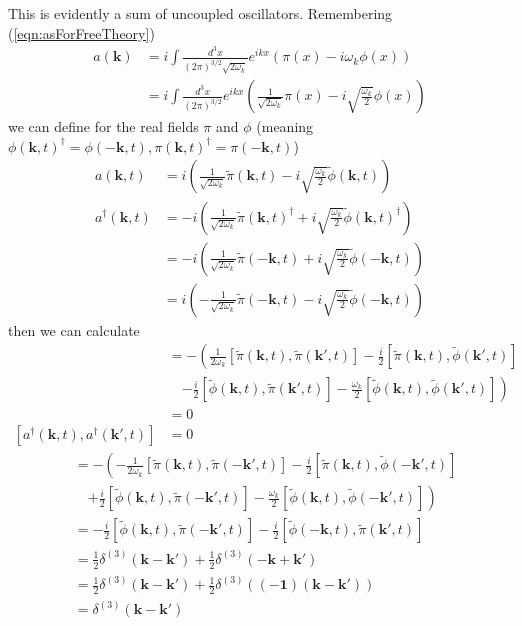 \documentclass{article}
\begin{document}
This is evidently a sum of uncoupled oscillators. Remembering  (\ref{eqn:asForFreeTheory})
\begin{align}
a(\mathbf{k})
&=i\int\frac{d^3x}{(2\pi)^{3/2}\sqrt{2\omega_k}}e^{ikx}(\pi(x)-i\omega_k\phi(x))\\
&=i\int\frac{d^3x}{(2\pi)^{3/2}}e^{ikx}\left(\frac{1}{\sqrt{2\omega_k}}\pi(x)-i\sqrt{\frac{\omega_k}{2}}\phi(x)\right) 
\end{align}
we can define for the real fields $\pi$ and $\phi$ (meaning $\phi(\mathbf{k},t)^\dagger=\phi(-\mathbf{k},t), \pi(\mathbf{k},t)^\dagger=\pi(-\mathbf{k},t)$)
\begin{align}
\label{eqn:akt}
a(\mathbf{k},t)
&=i\left(\frac{1}{\sqrt{2\omega_k}}\tilde\pi(\mathbf{k},t)-i\sqrt{\frac{\omega_k}{2}}\tilde\phi(\mathbf{k},t)\right)\\
a^\dagger(\mathbf{k},t)
&=-i\left(\frac{1}{\sqrt{2\omega_k}}\tilde\pi(\mathbf{k},t)^\dagger+i\sqrt{\frac{\omega_k}{2}}\tilde\phi(\mathbf{k},t)^\dagger\right)\\
&=-i\left(\frac{1}{\sqrt{2\omega_k}}\tilde\pi(-\mathbf{k},t)+i\sqrt{\frac{\omega_k}{2}}\tilde\phi(-\mathbf{k},t)\right)\\
&=i\left(-\frac{1}{\sqrt{2\omega_k}}\tilde\pi(-\mathbf{k},t)-i\sqrt{\frac{\omega_k}{2}}\tilde\phi(-\mathbf{k},t)\right) 
\end{align}
then we can calculate
\begin{align}
[a(\mathbf{k},t),a(\mathbf{k}',t)]
&=-\left(\frac{1}{2\omega_k}[\tilde\pi(\mathbf{k},t),\tilde\pi(\mathbf{k}',t)]
-\frac{i}{2}[\tilde\pi(\mathbf{k},t),\tilde\phi(\mathbf{k}',t)]\right.\\
&\quad\left.-\frac{i}{2}[\tilde\phi(\mathbf{k},t),\tilde\pi(\mathbf{k}',t)]
-\frac{\omega_k}{2}[\tilde\phi(\mathbf{k},t),\tilde\phi(\mathbf{k}',t)]\right)\\
&=0\\
[a^\dagger(\mathbf{k},t),a^\dagger(\mathbf{k}',t)]&=0
\end{align}
\begin{align}
[a(\mathbf{k},t),a^\dagger(\mathbf{k}',t)]
&=-\left(-\frac{1}{2\omega_k}[\tilde\pi(\mathbf{k},t),\tilde\pi(-\mathbf{k}',t)]
-\frac{i}{2}[\tilde\pi(\mathbf{k},t),\tilde\phi(-\mathbf{k}',t)]\right.\\
&\quad\left.+\frac{i}{2}[\tilde\phi(\mathbf{k},t),\tilde\pi(-\mathbf{k}',t)]
-\frac{\omega_k}{2}[\tilde\phi(\mathbf{k},t),\tilde\phi(-\mathbf{k}',t)]\right)\\
&=-\frac{i}{2}[\tilde\phi(\mathbf{k},t),\tilde\pi(-\mathbf{k}',t)]-\frac{i}{2}[\tilde\phi(-\mathbf{k},t),\tilde\pi(\mathbf{k}',t)]\\
&=\frac{1}{2}\delta^{(3)}(\mathbf{k-k'})+\frac{1}{2}\delta^{(3)}(\mathbf{-k+k'})\\
&=\frac{1}{2}\delta^{(3)}(\mathbf{k-k'})+\frac{1}{2}\delta^{(3)}(\mathbf{(-1)(k-k')})\\
&=\delta^{(3)}(\mathbf{k-k'})
\end{align}
\end{document}
